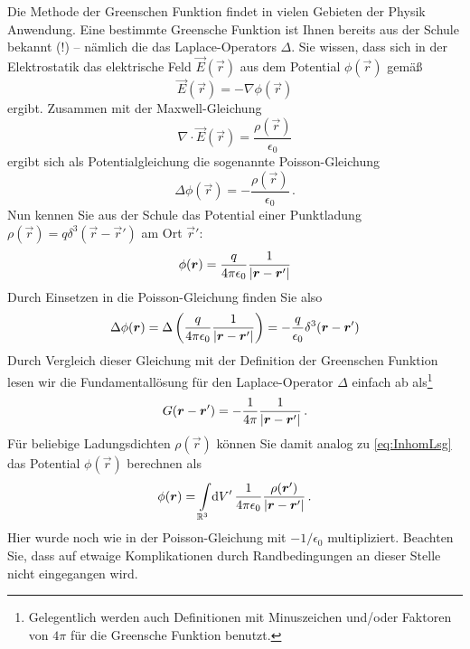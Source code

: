 \documentclass[paper=a4, fontsize=11.0pt, abstractoff, DIV12]{scrartcl}
\begin{document}
Die Methode der Greenschen Funktion findet in vielen Gebieten der Physik
Anwendung. Eine bestimmte Greensche Funktion ist Ihnen bereits aus der
Schule bekannt (!) -- nämlich die das Laplace-Operators $\Delta$. Sie
wissen, dass sich in der Elektrostatik das elektrische Feld $\vec E(\vec r)$
aus dem Potential $\phi(\vec r)$ gemäß
\begin{equation}
\vec E(\vec r) = - \nabla \phi(\vec r)
\end{equation}
ergibt. Zusammen mit der Maxwell-Gleichung
\begin{equation}
\nabla\cdot\vec E(\vec r) = \frac{\rho(\vec r)}{\epsilon_0}
\end{equation}
ergibt sich als Potentialgleichung die sogenannte Poisson-Gleichung
\begin{equation}
\Delta\phi(\vec r) = -\frac{\rho(\vec r)}{\epsilon_0}\,.
\end{equation}
Nun kennen Sie aus der Schule das Potential einer Punktladung $\rho(\vec r)
= q \delta^3(\vec r - \vec r')$ am Ort $\vec r'$:
\begin{equation}
\phi({\boldsymbol{r}}) = \frac{q}{4\pi\epsilon_0}\frac{1}{\left\vert {\ensuremath{\boldsymbol{r}}} - {\boldsymbol{r}}' \right\vert}
\end{equation}
Durch Einsetzen in die Poisson-Gleichung finden Sie also
\begin{equation}
\Delta\phi({\boldsymbol{r}}) = \Delta\left(\frac{q}{4\pi\epsilon_0}\frac{1}{\left\vert {\ensuremath{\boldsymbol{r}}} - {\boldsymbol{r}}' \right\vert}\right) = -\frac{q}{\epsilon_0} \delta^3({\boldsymbol{r}} - {\boldsymbol{r}}')
\end{equation}
Durch Vergleich dieser Gleichung mit der Definition der Greenschen Funktion
lesen wir die Fundamentallösung für den Laplace-Operator $\Delta$ einfach ab
als\footnote{Gelegentlich werden auch Definitionen mit Minuszeichen
und/oder Faktoren von $4\pi$ für die Greensche Funktion benutzt.}
\begin{equation}
G({\boldsymbol{r}} - {\boldsymbol{r}}') = -\frac{1}{4\pi}\frac{1}{\left\vert {\ensuremath{\boldsymbol{r}}} - {\boldsymbol{r}}' \right\vert}\,.
\end{equation}
Für beliebige Ladungsdichten $\rho(\vec r)$ können Sie damit analog zu
\eqref{eq:InhomLsg} das Potential $\phi(\vec r)$ berechnen als
\begin{equation}
\phi({\boldsymbol{r}}) = \int\limits_{\mathbb{R}^3}\!\mathrm{d} V'\,\frac{1}{4\pi\epsilon_0}\frac{\rho({\boldsymbol{r}}')}{\left\vert {\ensuremath{\boldsymbol{r}}} - {\boldsymbol{r}}' \right\vert}\,.
\end{equation}
Hier wurde noch wie in der Poisson-Gleichung mit $-1/\epsilon_0$
multipliziert. Beachten Sie, dass auf etwaige Komplikationen durch
Randbedingungen an dieser Stelle nicht eingegangen wird.





\end{document}
